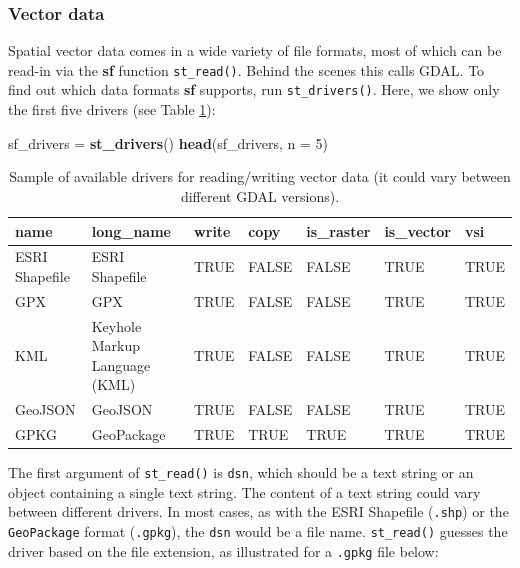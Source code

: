 \documentclass[]{krantz}
\newenvironment{Shaded}{\begin{snugshade}}{\end{snugshade}}
\newcommand{\DataTypeTok}[1]{\textcolor[rgb]{0.27,0.27,0.27}{#1}}
\newcommand{\DecValTok}[1]{\textcolor[rgb]{0.06,0.06,0.06}{#1}}
\newcommand{\KeywordTok}[1]{\textcolor[rgb]{0.27,0.27,0.27}{\textbf{#1}}}
\newcommand{\NormalTok}[1]{#1}
\newcommand{\StringTok}[1]{\textcolor[rgb]{0.5,0.5,0.5}{#1}}
\begin{document}
\hypertarget{vector-data-1}{%
\subsubsection{Vector data}\label{vector-data-1}}

Spatial vector data comes in a wide variety of file formats, most of which can be read-in via the \textbf{sf} function \texttt{st\_read()}.
Behind the scenes this calls GDAL.
To find out which data formats \textbf{sf} supports, run \texttt{st\_drivers()}.
Here, we show only the first five drivers (see Table \ref{tab:drivers}):

\begin{Shaded}
\begin{Highlighting}[]
\NormalTok{sf_drivers =}\StringTok{ }\KeywordTok{st_drivers}\NormalTok{()}
\KeywordTok{head}\NormalTok{(sf_drivers, }\DataTypeTok{n =} \DecValTok{5}\NormalTok{)}
\end{Highlighting}
\end{Shaded}

\begin{table}[t]

\caption[Sample of available vector drivers.]{\label{tab:drivers}Sample of available drivers for reading/writing vector data (it could vary between different GDAL versions).}
\centering
\begin{tabular}{l>{\raggedright\arraybackslash}p{7em}lllll}
\toprule
name & long\_name & write & copy & is\_raster & is\_vector & vsi\\
\midrule
ESRI Shapefile & ESRI Shapefile & TRUE & FALSE & FALSE & TRUE & TRUE\\
GPX & GPX & TRUE & FALSE & FALSE & TRUE & TRUE\\
KML & Keyhole Markup Language (KML) & TRUE & FALSE & FALSE & TRUE & TRUE\\
GeoJSON & GeoJSON & TRUE & FALSE & FALSE & TRUE & TRUE\\
GPKG & GeoPackage & TRUE & TRUE & TRUE & TRUE & TRUE\\
\bottomrule
\end{tabular}
\end{table}

The first argument of \texttt{st\_read()} is \texttt{dsn}, which should be a text string or an object containing a single text string.
The content of a text string could vary between different drivers.
In most cases, as with the ESRI Shapefile (\texttt{.shp}) or the \texttt{GeoPackage} format (\texttt{.gpkg}), the \texttt{dsn} would be a file name.
\texttt{st\_read()} guesses the driver based on the file extension, as illustrated for a \texttt{.gpkg} file below:
\end{document}
